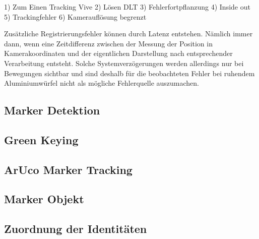 1) Zum Einen Tracking Vive
2) Lösen DLT
3) Fehlerfortpflanzung
4) Inside out
5) Trackingfehler
6) Kamerauflösung begrenzt


Zusätzliche Registrierungsfehler können durch Latenz entstehen. Nämlich immer dann, wenn eine Zeitdifferenz zwischen der Messung der Position in Kamerakoordinaten und der eigentlichen Darstellung nach entsprechender
Verarbeitung entsteht. Solche Systemverzögerungen werden allerdings nur bei Bewegungen sichtbar und sind deshalb für die beobachteten Fehler bei ruhendem Aluminiumwürfel nicht als mögliche Fehlerquelle auszumachen.  
\subsection{Marker Detektion}
\subsection{Green Keying}
\subsection{ArUco Marker Tracking}

\subsection{Marker Objekt}
\subsection{Zuordnung der Identitäten}

\newpage